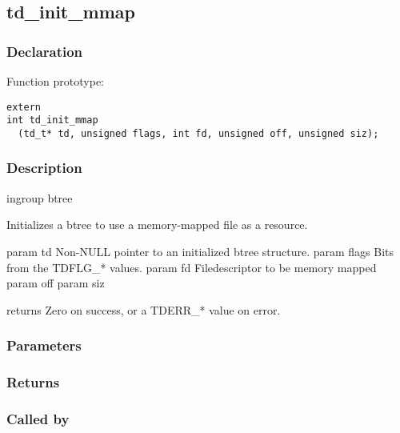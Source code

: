 
\newpage
\subsection{td\_init\_mmap}
\subsubsection{Declaration} Function prototype:

\begin{verbatim}
extern
int td_init_mmap
  (td_t* td, unsigned flags, int fd, unsigned off, unsigned siz);
\end{verbatim}

\subsubsection{Description}


 ingroup btree

 Initializes a btree to use a memory-mapped file as a resource.

 param td Non-NULL pointer to an initialized btree structure.
 param flags Bits from the TDFLG\_* values.
 param fd Filedescriptor to be memory mapped
 param off
 param siz

 returns Zero on success, or a TDERR\_* value on error.
 

\subsubsection{Parameters}
\subsubsection{Returns}
\subsubsection{Called by}
